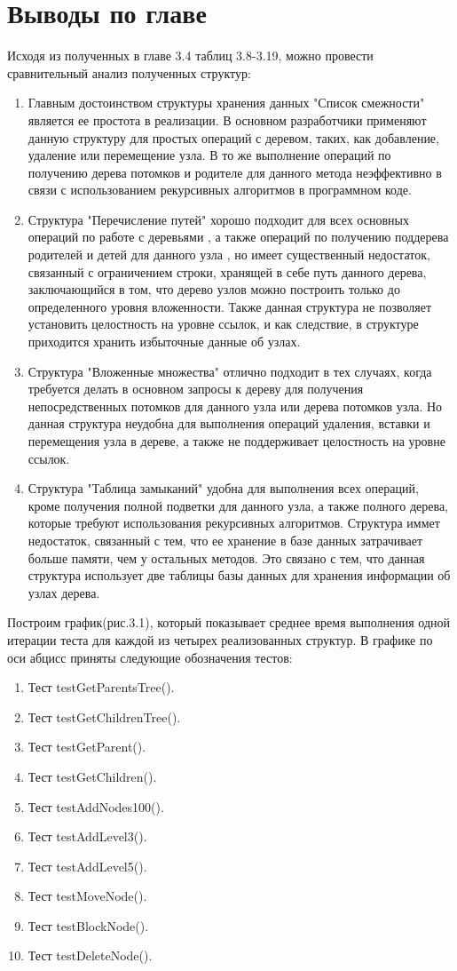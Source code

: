 \documentclass[a4paper,14pt]{extreport}
\theoremstyle{definition}
\begin{document}
\section{Выводы по главе}
Исходя из полученных в главе 3.4 таблиц 3.8-3.19, можно провести сравнительный анализ полученных структур:
\begin{enumerate}
\item Главным достоинством структуры хранения данных "Список смежности" является ее простота в реализации. В основном разработчики применяют данную структуру для простых операций с деревом, таких, как добавление, удаление или перемещение узла. В то же выполнение операций по получению дерева потомков и родителе для данного метода неэффективно в связи с использованием рекурсивных алгоритмов в программном коде.
\item Структура "Перечисление путей" хорошо подходит для всех основных операций по работе с деревьями , а также операций по получению поддерева родителей и детей для данного узла , но имеет существенный недостаток, связанный с ограничением строки, хранящей в себе путь данного дерева, заключающийся в том, что дерево узлов можно построить только до определенного уровня вложенности. Также данная структура не позволяет установить целостность на уровне ссылок, и как следствие, в структуре приходится хранить избыточные данные об узлах.
\item Структура "Вложенные множества" отлично подходит в тех случаях, когда требуется делать в основном запросы к дереву для получения непосредственных потомков для данного узла или дерева потомков узла. Но данная структура неудобна для выполнения операций удаления, вставки и перемещения узла в дереве, а также не поддерживает целостность на уровне ссылок.
\item  Структура "Таблица замыканий" удобна для выполнения всех операций, кроме получения полной подветки для данного узла, а также полного дерева, которые требуют использования рекурсивных алгоритмов. Структура иммет недостаток, связанный с тем, что ее хранение в базе данных затрачивает больше памяти, чем у остальных методов. Это связано с тем, что данная структура использует две таблицы базы данных для хранения информации об узлах дерева.
\end{enumerate}
Построим график(рис.3.1), который показывает среднее время выполнения одной итерации теста для каждой из четырех реализованных структур. В графике по оси абцисс приняты следующие обозначения тестов:
\begin{enumerate}
\item Тест testGetParentsTree().
\item Тест testGetChildrenTree().
\item Тест testGetParent().
\item Тест testGetChildren().
\item Тест testAddNodes100().
\item Тест testAddLevel3().
\item Тест testAddLevel5().
\item Тест testMoveNode().
\item Тест testBlockNode().
\item Тест testDeleteNode().
\end{enumerate}
\end{document}
